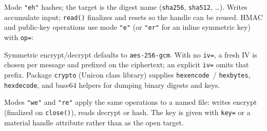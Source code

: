 
Mode \texttt{"eh"} hashes; the target is the digest name
(\texttt{sha256}, \texttt{sha512}, \ldots). Writes accumulate input;
\texttt{read()} finalizes and resets so the handle can be reused.
HMAC and public-key operations use mode \texttt{"e"} (or
\texttt{"er"} for an inline symmetric key) with \texttt{op=}:



Symmetric encrypt/decrypt defaults to \texttt{aes-256-gcm}. With no
\texttt{iv=}, a fresh IV is chosen per message and prefixed on the
ciphertext; an explicit \texttt{iv=} omits that prefix. Package
\texttt{crypto} (Unicon class library) supplies \texttt{hexencode}~/
\texttt{hexbytes}, \texttt{hexdecode}, and base64 helpers for dumping
binary digests and keys.

Modes \texttt{"we"} and \texttt{"re"} apply the same operations to a
named file: writes encrypt (finalized on \texttt{close()}), reads
decrypt or hash. The key is given with \texttt{key=} or a material
handle attribute rather than as the open target.

